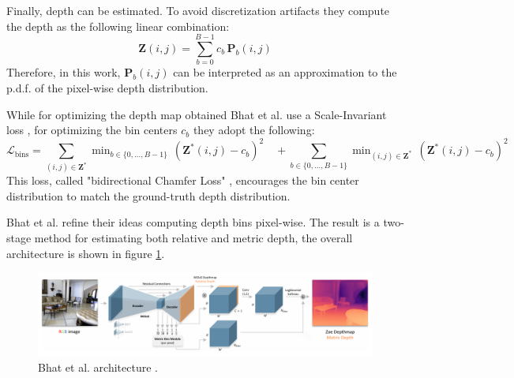 Finally, depth can be estimated.
To avoid discretization artifacts they compute the depth as the following linear combination:
\[
	\mathbf{Z}(i, j) = \sum_{b=0}^{B-1} c_{b} \, \mathbf{P}_{b}(i, j)
\]
Therefore, in this work, $\mathbf{P}_{b}(i, j)$ can be interpreted as an approximation to the p.d.f. of the pixel-wise depth distribution.

While for optimizing the depth map obtained Bhat et al. use a Scale-Invariant loss \cite{Eigen}, for optimizing the bin centers $c_{b}$ they adopt the following:
\[
	\mathcal{L}_{\text{bins}} =
	\sum_{(i, j) \in \mathbf{Z}^{*}} \mathop{\text{min}}_{b \in \{0, \dotsc, B-1\}} \, (\mathbf{Z}^{*}(i, j) - c_{b})^{2} \quad+
	\sum_{b \in \{0, \dotsc, B-1\}} \mathop{\text{min}}_{(i, j) \in \mathbf{Z}^{*}} \, (\mathbf{Z}^{*}(i, j) - c_{b})^{2}
\]
This loss, called "bidirectional Chamfer Loss" \cite{AdaBins}, encourages the bin center distribution to match the ground-truth depth distribution.

Bhat et al. \cite{ZoeDepth} refine their ideas computing depth bins pixel-wise.
The result is a two-stage method for estimating both relative and metric depth, the overall architecture is shown in figure \ref{fig:zoe_depth}.

\begin{figure}
	\centering
	\includegraphics[scale=0.3]{figs/zoe_depth}
	\caption{Bhat et al. architecture \cite{ZoeDepth}. \label{fig:zoe_depth}}
\end{figure}

